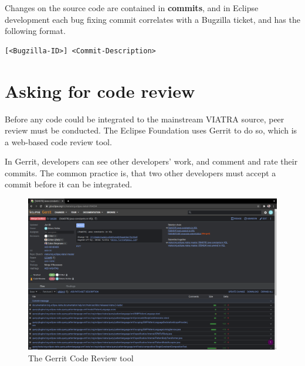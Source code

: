 \documentclass[11pt,a4paper,oneside]{report}
\begin{document}
Changes on the source code are contained in \textbf{commits}, and in Eclipse
development each bug fixing commit correlates with a Bugzilla ticket, and has
the following format.

\begin{lstlisting}
[<Bugzilla-ID>] <Commit-Description>
\end{lstlisting}

\section{Asking for code review}
Before any code could be integrated to the mainstream VIATRA source, peer review
must be conducted. The Eclipse Foundation uses Gerrit to do so, which is a
web-based code review tool.

In Gerrit, developers can see other developers' work, and comment and rate their
commits. The common practice is, that two other developers must accept a
commit before it can be integrated.

\begin{figure}[ht]
\centering
\includegraphics[width=150mm, keepaspectratio]{figures/gerrit.png}
\caption{The Gerrit Code Review tool}
\label{fig:gerrit}
\end{figure}


\listoffigures{}
\listoftables{}

\nocite{*} %


\label{page:last}
\end{document}
